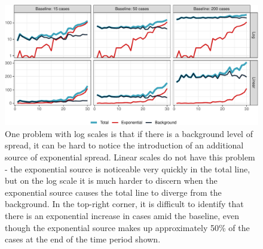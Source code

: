 \documentclass[article]{jdssv}\usepackage[]{graphicx}\usepackage[]{color}
\newenvironment{knitrout}{}{} %
\begin{document}
\begin{knitrout}\footnotesize
{}\color{fgcolor}\begin{figure}

{\centering \includegraphics[width=.95\linewidth]{Figures_R/fig-log-scale-failures-1} 

}

\caption[One problem with log scales is that if there is a background level of spread, it can be hard to notice the introduction of an additional source of exponential spread]{One problem with log scales is that if there is a background level of spread, it can be hard to notice the introduction of an additional source of exponential spread. Linear scales do not have this problem - the exponential source is noticeable very quickly in the total line, but on the log scale it is much harder to discern when the exponential source causes the total line to diverge from the background. In the top-right corner, it is difficult to identify that there is an exponential increase in cases amid the baseline, even though the exponential source makes up approximately 50\% of the cases at the end of the time period shown.}\label{fig:log-scale-failures}
\end{figure}

\end{knitrout}

\end{document}
